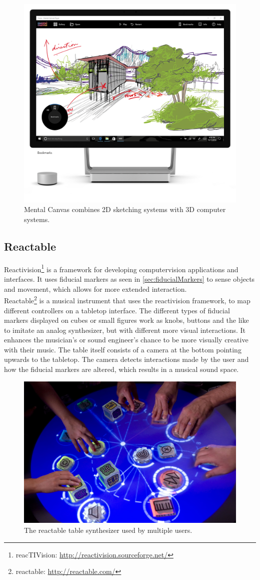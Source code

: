 				\begin{figure}[H]
					\centering
					\includegraphics[width=0.5\linewidth]{figure/Analysis/mentalCanvas.png}
					\caption{Mental Canvas combines 2D sketching systems with 3D computer systems.}
					\label{fig:mentalCanvas}
				\end{figure}

		
		\subsection{Reactable}
			Reactivision\footnote{reacTIVision: \url{http://reactivision.sourceforge.net/}} is a framework for developing computervision applications and interfaces. It uses fiducial markers as seen in  \autoref{sec:fiducialMarkers} to sense objects and movement, which allows for more extended interaction. \\
			
			Reactable\footnote{reactable: \url{http://reactable.com/}} is a musical instrument that uses the reactivision framework, to map different controllers on a tabletop interface. The different types of fiducial markers displayed on cubes or small figures work as knobs, buttons and the like to imitate an analog synthesizer, but with different more visual interactions. It enhances the musician's or sound engineer's chance to be more visually creative with their music. The table itself consists of a camera at the bottom pointing upwards to the tabletop. The camera detects interactions made by the user and how the fiducial markers are altered, which results in a musical sound space.
				\begin{figure}[H]
					\centering
					\includegraphics[width=0.6\linewidth]{figure/Analysis/reactable}
					\caption{The reactable table synthesizer used by multiple users.}
					\label{fig:reactable}
				\end{figure} 
			
